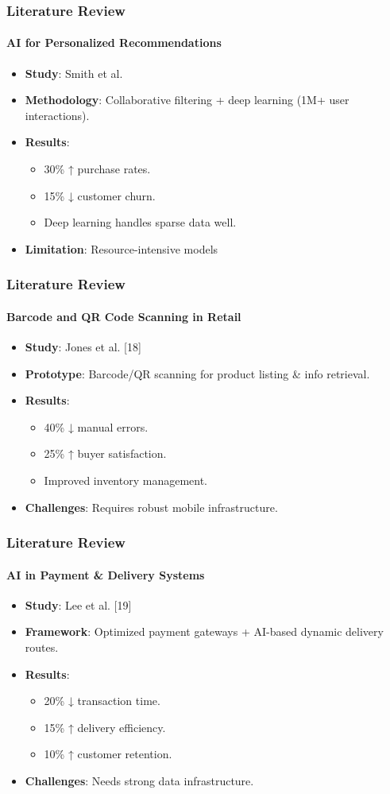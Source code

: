 \documentclass{beamer}
\begin{document}
\begin{frame}
	\frametitle{Literature Review}
	\framesubtitle{AI for Personalized Recommendations}
	\begin{itemize}
		\item \textbf{Study}: Smith et al.
		\item \textbf{Methodology}: Collaborative filtering + deep learning (1M+ user interactions).
		\item \textbf{Results}:
		      \begin{itemize}
			      \item 30\% ↑ purchase rates.
			      \item 15\% ↓ customer churn.
			      \item Deep learning handles sparse data well.
		      \end{itemize}
		\item \textbf{Limitation}: Resource-intensive models
	\end{itemize}
\end{frame}

\begin{frame}
	\frametitle{Literature Review}
	\framesubtitle{Barcode and QR Code Scanning in Retail}
	\begin{itemize}
		\item \textbf{Study}: Jones et al. [18]
		\item \textbf{Prototype}: Barcode/QR scanning for product listing & info retrieval.
		\item \textbf{Results}:
		      \begin{itemize}
			      \item 40\% ↓ manual errors.
			      \item 25\% ↑ buyer satisfaction.
			      \item Improved inventory management.
		      \end{itemize}
		\item \textbf{Challenges}: Requires robust mobile infrastructure.
	\end{itemize}
\end{frame}

\begin{frame}
	\frametitle{Literature Review}
	\framesubtitle{AI in Payment \& Delivery Systems}
	\begin{itemize}
		\item \textbf{Study}: Lee et al. [19]
		\item \textbf{Framework}: Optimized payment gateways + AI-based dynamic delivery routes.
		\item \textbf{Results}:
		      \begin{itemize}
			      \item 20\% ↓ transaction time.
			      \item 15\% ↑ delivery efficiency.
			      \item 10\% ↑ customer retention.
		      \end{itemize}
		\item \textbf{Challenges}: Needs strong data infrastructure.
	\end{itemize}
\end{frame}
\end{document}
